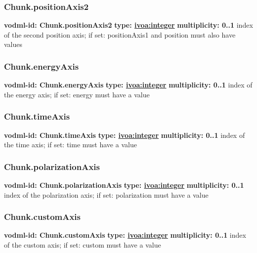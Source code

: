     \subsubsection{Chunk.positionAxis2}
      \textbf{vodml-id: Chunk.positionAxis2} \newline
      \textbf{type: \hyperref[sect:ivoa]{ivoa:integer}} \newline
      \textbf{multiplicity: 0..1} \newline
      index of the second position axis; if set: positionAxis1 and position must also have values

    \subsubsection{Chunk.energyAxis}
      \textbf{vodml-id: Chunk.energyAxis} \newline
      \textbf{type: \hyperref[sect:ivoa]{ivoa:integer}} \newline
      \textbf{multiplicity: 0..1} \newline
      index of the energy axis; if set: energy must have a value

    \subsubsection{Chunk.timeAxis}
      \textbf{vodml-id: Chunk.timeAxis} \newline
      \textbf{type: \hyperref[sect:ivoa]{ivoa:integer}} \newline
      \textbf{multiplicity: 0..1} \newline
      index of the time axis; if set: time must have a value

    \subsubsection{Chunk.polarizationAxis}
      \textbf{vodml-id: Chunk.polarizationAxis} \newline
      \textbf{type: \hyperref[sect:ivoa]{ivoa:integer}} \newline
      \textbf{multiplicity: 0..1} \newline
      index of the polarization axis; if set: polarization must have a value

    \subsubsection{Chunk.customAxis}
      \textbf{vodml-id: Chunk.customAxis} \newline
      \textbf{type: \hyperref[sect:ivoa]{ivoa:integer}} \newline
      \textbf{multiplicity: 0..1} \newline
      index of the custom axis; if set: custom must have a value

